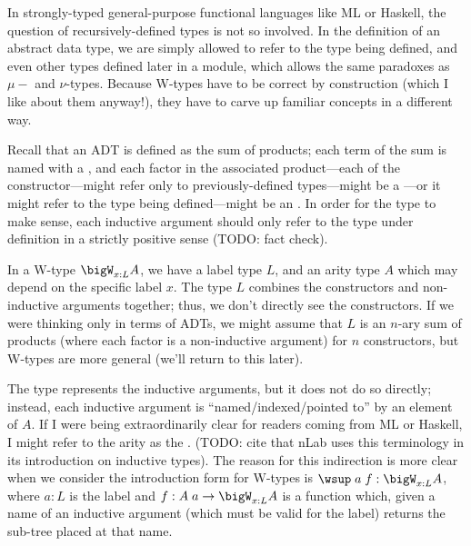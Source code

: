 \documentclass[11pt]{article} %
\theoremstyle{definition}
\theoremstyle{remark}
\newenvironment{aside}
  {\begin{mdframed}[style=0,%
      leftline=false,rightline=false,leftmargin=2em,rightmargin=2em,%
          innerleftmargin=0pt,innerrightmargin=0pt,linewidth=0.75pt,%
      skipabove=7pt,skipbelow=7pt]\small}
  {\end{mdframed}}
\begin{document}
\begin{aside}
  In strongly-typed general-purpose functional languages like ML or Haskell, the question of recursively-defined types is not so involved.
  In the definition of an abstract data type, we are simply allowed to refer to the type being defined, and even other types defined later in a module, which allows the same paradoxes as $\mu-$ and $\nu$-types.
  Because W-types have to be correct by construction (which I like about them anyway!), they have to carve up familiar concepts in a different way.

  Recall that an ADT is defined as the sum of products; each term of the sum is named with a , and each factor in the associated product---each  of the constructor---might refer only to previously-defined types---might be a ---or it might refer to the type being defined---might be an .
  In order for the type to make sense, each inductive argument should only refer to the type under definition in a strictly positive sense (TODO: fact check).

  In a W-type $\bigW_{x:L}A$, we have a label type $L$, and an arity type $A$ which may depend on the specific label $x$.
  The  type $L$ combines the constructors and non-inductive arguments together; thus, we don't directly see the constructors.
  If we were thinking only in terms of ADTs, we might assume that $L$ is an $n$-ary sum of products (where each factor is a non-inductive argument) for $n$ constructors, but W-types are more general (we'll return to this later).

  The  type represents the inductive arguments, but it does not do so directly; instead, each inductive argument is ``named/indexed/pointed to'' by an element of $A$.
  If I were being extraordinarily clear for readers coming from ML or Haskell, I might refer to the arity as the .
  (TODO: cite that nLab uses this terminology in its introduction on inductive types).
  The reason for this indirection is more clear when we consider the introduction form for W-types is $\wsup\;a\;f : \bigW_{x:L}A$, where $a : L$ is the label and $f : A\;a \to \bigW_{x:L}A$ is a function which, given a name of an inductive argument (which must be valid for the label) returns the sub-tree placed at that name.
  

\end{aside}
\end{document}
